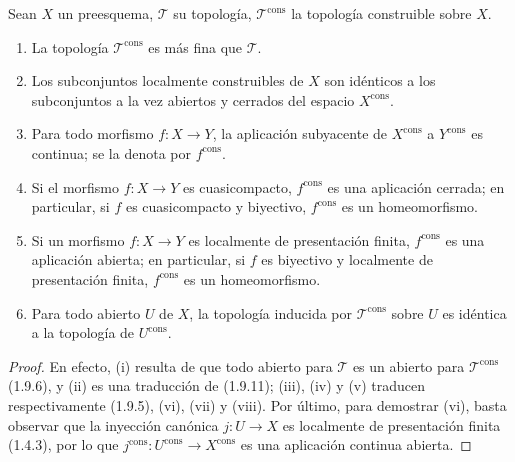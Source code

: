 \begin{proposition}[1.9.14]
\label{IV.1.9.14-fr}
Sean $X$ un preesquema, $\mathscr T$ su topología,
$\mathscr T^{\mathrm{cons}}$ la topología construible sobre $X$.
\begin{enumerate}
  \item[\textup{(i)}] La topología $\mathscr T^{\mathrm{cons}}$ es más fina que
  $\mathscr T$.
  \item[\textup{(ii)}] Los subconjuntos localmente construibles de $X$ son idénticos
  a los subconjuntos a la vez abiertos y cerrados del espacio $X^{\mathrm{cons}}$.
  \item[\textup{(iii)}] Para todo morfismo $f:X\to Y$, la aplicación subyacente de
  $X^{\mathrm{cons}}$ a $Y^{\mathrm{cons}}$ es continua; se la denota por
  $f^{\mathrm{cons}}$.
  \item[\textup{(iv)}] Si el morfismo $f:X\to Y$ es cuasicompacto,
  $f^{\mathrm{cons}}$ es una aplicación cerrada; en particular, si $f$
  es cuasicompacto y biyectivo, $f^{\mathrm{cons}}$ es un homeomorfismo.
  \item[\textup{(v)}] Si un morfismo $f:X\to Y$ es localmente de presentación
  finita, $f^{\mathrm{cons}}$ es una aplicación abierta; en particular,
  si $f$ es biyectivo y localmente de presentación finita,
  $f^{\mathrm{cons}}$ es un homeomorfismo.
  \item[\textup{(vi)}] Para todo abierto $U$ de $X$, la topología inducida por
  $\mathscr T^{\mathrm{cons}}$ sobre $U$ es idéntica a la topología de
  $U^{\mathrm{cons}}$.
\end{enumerate}
\end{proposition}

\begin{proof}
En efecto, (i) resulta de que todo abierto para $\mathscr T$ es un abierto
para $\mathscr T^{\mathrm{cons}}$ (1.9.6), y (ii) es una traducción de
(1.9.11); (iii), (iv) y (v) traducen respectivamente (1.9.5), (vi), (vii)
y (viii). Por último, para demostrar (vi), basta observar que la inyección
canónica $j:U\to X$ es localmente de presentación finita (1.4.3), por lo que
$j^{\mathrm{cons}}:U^{\mathrm{cons}}\to X^{\mathrm{cons}}$ es una
aplicación continua abierta.
\end{proof}

